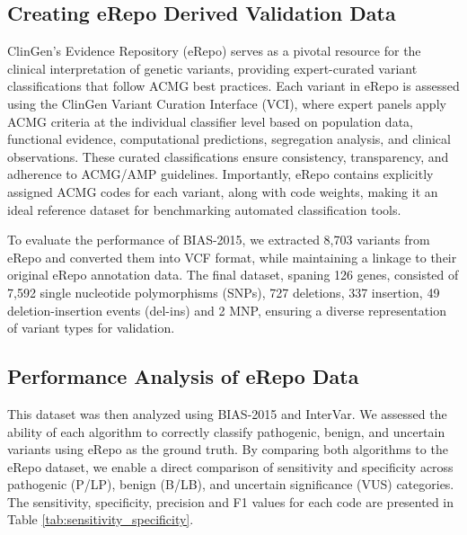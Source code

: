 \documentclass[unnumsec,webpdf,contemporary,large]{oup-authoring-template}
\theoremstyle{thmstyleone}
\theoremstyle{thmstyletwo}
\theoremstyle{thmstylethree}
\begin{document}
\subsection{Creating eRepo Derived Validation Data}
ClinGen’s Evidence Repository (eRepo) serves as a pivotal resource for the clinical interpretation of genetic variants, providing expert-curated variant classifications that follow ACMG best practices. Each variant in eRepo is assessed using the ClinGen Variant Curation Interface (VCI), where expert panels apply ACMG criteria at the individual classifier level based on population data, functional evidence, computational predictions, segregation analysis, and clinical observations. These curated classifications ensure consistency, transparency, and adherence to ACMG/AMP guidelines. Importantly, eRepo contains explicitly assigned ACMG codes for each variant, along with code weights, making it an ideal reference dataset for benchmarking automated classification tools.

To evaluate the performance of BIAS-2015, we extracted 8,703 variants from eRepo and converted them into VCF format, while maintaining a linkage to their original eRepo annotation data. The final dataset, spaning 126 genes, consisted of 7,592 single nucleotide polymorphisms (SNPs), 727 deletions, 337 insertion, 49 deletion-insertion events (del-ins) and 2 MNP, ensuring a diverse representation of variant types for validation. 

\subsection{Performance Analysis of eRepo Data}
This dataset was then analyzed using BIAS-2015 and InterVar. We assessed the ability of each algorithm to correctly classify pathogenic, benign, and uncertain variants using eRepo as the ground truth. By comparing both algorithms to the eRepo dataset, we enable a direct comparison of sensitivity and specificity across pathogenic (P/LP), benign (B/LB), and uncertain significance (VUS) categories. The sensitivity, specificity, precision and F1 values for each code are presented in Table \ref{tab:sensitivity_specificity}.
\end{document}
